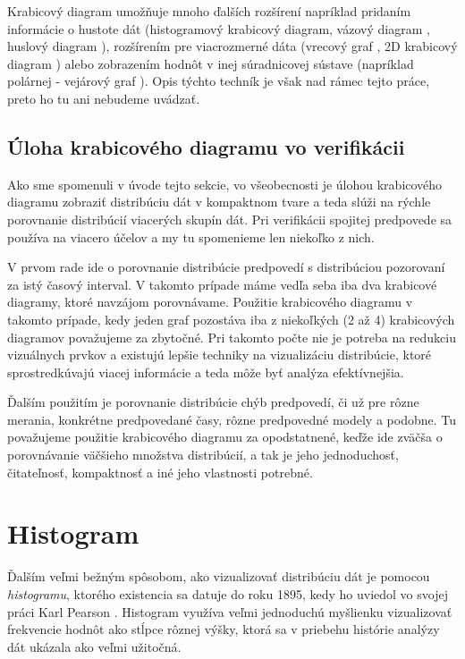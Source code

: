 Krabicový diagram umožňuje mnoho ďalších rozšírení napríklad pridaním informácie o hustote dát (histogramový krabicový diagram, vázový diagram \cite{HistVasePlot} , huslový diagram \cite{ViolinPlot}), rozšírením pre viacrozmerné dáta (vrecový graf \cite{Bagplot}, 2D krabicový diagram \cite{Boxplot2D} ) alebo zobrazením hodnôt v inej súradnicovej sústave (napríklad polárnej - vejárový graf \cite{FanChart}). Opis týchto techník je však nad rámec tejto práce, preto ho tu ani nebudeme uvádzať.

\subsection{Úloha krabicového diagramu vo verifikácii}

Ako sme spomenuli v úvode tejto sekcie, vo všeobecnosti je úlohou krabicového diagramu zobraziť distribúciu dát v kompaktnom tvare a teda slúži na rýchle porovnanie distribúcií viacerých skupín dát.
Pri verifikácii spojitej predpovede sa používa na viacero účelov a my tu spomenieme len niekoľko z nich. 

V prvom rade ide o porovnanie distribúcie predpovedí s distribúciou pozorovaní za istý časový interval. V takomto prípade máme vedľa seba iba dva krabicové diagramy, ktoré navzájom porovnávame. Použitie krabicového diagramu v takomto prípade, kedy jeden graf pozostáva iba z niekoľkých (2 až 4) krabicových diagramov považujeme za zbytočné. Pri takomto počte nie je potreba na redukciu vizuálnych prvkov a existujú lepšie techniky na vizualizáciu distribúcie, ktoré sprostredkúvajú viacej informácie a teda môže byť analýza efektívnejšia. 

Ďalším použitím je porovnanie distribúcie chýb predpovedí, či už pre rôzne merania, konkrétne predpovedané časy, rôzne predpovedné modely a podobne. Tu považujeme použitie krabicového diagramu za opodstatnené, keďže ide zväčša o porovnávanie väčšieho množstva distribúcií, a tak je jeho jednoduchosť, čitateľnosť, kompaktnosť a iné jeho vlastnosti potrebné.

\section{Histogram}
Ďalším veľmi bežným spôsobom, ako vizualizovať distribúciu dát je pomocou \textit{histogramu}, ktorého existencia sa datuje do roku 1895, kedy ho uviedol vo svojej práci Karl Pearson \cite{histogram}. Histogram využíva veľmi jednoduchú myšlienku vizualizovať frekvencie hodnôt ako stĺpce rôznej výšky, ktorá sa v priebehu histórie analýzy dát ukázala ako veľmi užitočná.

